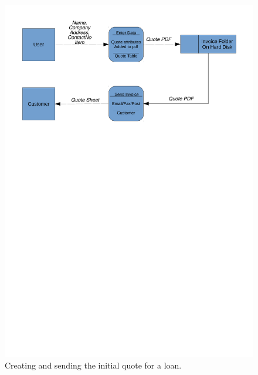 \begin{center}
    \begin{figure}[H]
        \centerline{\includegraphics[width=\textwidth]{./Analysis/Dataflow/Old_System/Old_Sys_Data_flow_quote.pdf}}
        \caption{Creating and sending the initial quote for a loan.} \label{fig:print_function_result}
    \end{figure}
    

\end{center}
